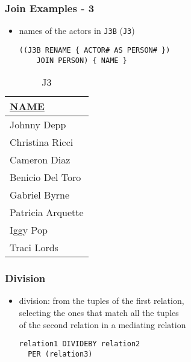 \documentclass[dvipsnames]{beamer}
\theoremstyle{plain}
\begin{document}
\begin{frame}[fragile]
  \frametitle{Join Examples - 3}

  \begin{itemize}
    \item names of the actors in \texttt{J3B} (\texttt{J3})
    \begin{lstlisting}
((J3B RENAME { ACTOR# AS PERSON# })
    JOIN PERSON) { NAME }
    \end{lstlisting}
  \end{itemize}

  \vspace{-10pt}
  \begin{tiny}
  \begin{table}
    \caption{J3}
    \begin{tabular}{|l|}\hline
\underline{NAME} \\[2pt]\hline\hline
Johnny Depp      \\\hline
Christina Ricci  \\\hline
Cameron Diaz     \\\hline
Benicio Del Toro \\\hline
Gabriel Byrne    \\\hline
Patricia Arquette\\\hline
Iggy Pop         \\\hline
Traci Lords      \\\hline
    \end{tabular}
  \end{table}
  \end{tiny}
\end{frame}

\begin{frame}[fragile]
  \frametitle{Division}

  \begin{itemize}
    \item \alert{division}: from the tuples of the first relation,\\
      selecting the ones that match all the tuples\\
      of the second relation in a mediating relation
    \begin{lstlisting}
relation1 DIVIDEBY relation2
  PER (relation3)
    \end{lstlisting}
  \end{itemize}
\end{frame}
\end{document}
